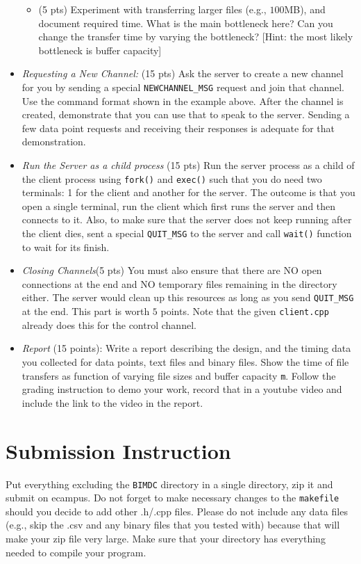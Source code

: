 \documentclass[12pt]{article}
\begin{document}
\begin{itemize}
\begin{itemize}
\item (5 pts) Experiment with transferring larger files (e.g., $100$MB), and document required time. What is the main bottleneck here? Can you change the transfer time by varying the bottleneck? [Hint: the most likely bottleneck is buffer capacity]
\end{itemize}

\item \emph{Requesting a New Channel:} (15 pts)
Ask the server to create a new channel for you by sending a special \texttt{NEWCHANNEL\_MSG} request and join that channel. Use the command format shown in the example above. After the channel is created, demonstrate that you can use that to speak to the server. Sending a few data point requests and receiving their responses is adequate for that demonstration.

\item \emph{Run the Server as a child process} (15 pts)
Run the server process as a child of the client process using \texttt{fork()} and \texttt{exec()} such that you do need two terminals: 1 for the client and another for the server. The outcome is that you open a single terminal, run the client which first runs the server and then connects to it. Also, to make sure that the server does not keep running after the client dies, sent a special \texttt{QUIT\_MSG} to the server and call \texttt{wait()} function to wait for its finish. 

\item \emph{Closing Channels}(5 pts)
You must also ensure that there are NO open connections at the end and NO temporary files remaining in the directory either. The server would clean up this resources as long as you send \texttt{QUIT\_MSG} at the end. This part is worth $5$ points. Note that the given \texttt{client.cpp} already does this for the control channel.

\item \emph{Report} (15 points): Write a report describing the design, and the timing data you collected for data points, text files and binary files. Show the time of file transfers as function of varying file sizes and buffer capacity \texttt{m}. Follow the grading instruction to demo your work, record that in a youtube video and include the link to the video in the report. 

\end{itemize}


\section{Submission Instruction}
Put everything excluding the \texttt{BIMDC} directory in a single directory, zip it and submit on ecampus. Do not forget to make necessary changes to the \texttt{makefile} should you decide to add other .h/.cpp files. Please do not include any data files (e.g., skip the .csv and any binary files that you tested with) because that will make your zip file very large. Make sure that your directory has everything needed to compile your program.
\end{document}
